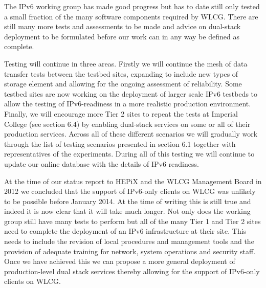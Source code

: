 The IPv6 working group has made good progress but has to date still only tested a small fraction of the many 
software components required by WLCG. There are still many more tests and 
assessments to be made and advice on dual-stack deployment to be formulated before 
our work can in any way be defined as complete.

Testing will continue in three areas. Firstly we will continue the mesh of data transfer tests between
the testbed sites, expanding to include new types of storage element and allowing for the ongoing
assessment of reliability. Some testbed sites are now working on the deployment of larger scale IPv6 testbeds
to allow the testing of IPv6-readiness in a more realistic production environment. Finally, we will encourage 
more Tier 2 sites to repeat the
tests at Imperial College (see section 6.4) by enabling dual-stack services on some or all of their production
services. Across all of these different scenarios we will gradually work through the list of testing scenarios presented
in section 6.1 together with representatives of the experiments.  During all of this testing we
will continue to update our online database with the details of IPv6 readiness.

At the time of our status report to HEPiX and the WLCG Management Board in 2012 we concluded that
the support of IPv6-only clients on WLCG was unlikely to be possible before January 2014. At the time of writing this is still true and indeed it is now clear that it will take much longer. Not only does the working group still have many tests to perform
but all of the many Tier 1 and Tier 2 sites need to complete the deployment of an IPv6 infrastructure at their site. This needs to include
the revision of local procedures and management tools and the provision of adequate training for network,
system operations and security staff. Once we have achieved this we can propose a more general deployment of 
production-level dual stack services thereby allowing for the support of IPv6-only clients on WLCG.
